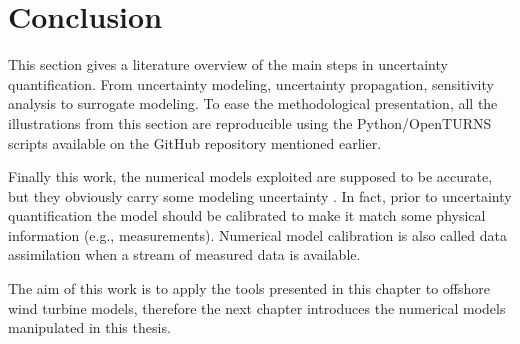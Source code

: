 \section{Conclusion}

This section gives a literature overview of the main steps in uncertainty quantification. 
From uncertainty modeling, uncertainty propagation, sensitivity analysis to surrogate modeling. 
To ease the methodological presentation, all the illustrations from this section are reproducible using the Python/OpenTURNS scripts available on the GitHub repository mentioned earlier. 

Finally this work, the numerical models exploited are supposed to be accurate, but they obviously carry some modeling uncertainty \citep{oberkampf_2010_VVUQ}. 
In fact, prior to uncertainty quantification the model should be calibrated to make it match some physical information (e.g., measurements). 
Numerical model calibration is also called data assimilation when a stream of measured data is available. 

The aim of this work is to apply the tools presented in this chapter to offshore wind turbine models, therefore the next chapter introduces the numerical models manipulated in this thesis.  






